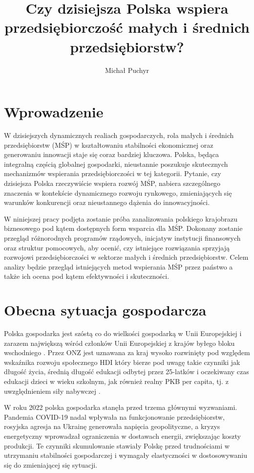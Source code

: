 \documentclass[11pt]{article}
\author{Michał Puchyr}
\date{}
\title{\textbf{Czy dzisiejsza Polska wspiera przedsiębiorczość małych i średnich przedsiębiorstw?}}
\begin{document}
\maketitle
\section*{Wprowadzenie}
W dzisiejszych dynamicznych realiach gospodarczych, rola małych i średnich przedsiębiorstw (MŚP) w kształtowaniu stabilności ekonomicznej
oraz generowaniu innowacji staje się coraz bardziej kluczowa. Polska, będąca integralną częścią globalnej gospodarki,
nieustannie poszukuje skutecznych mechanizmów wspierania przedsiębiorczości w tej kategorii. Pytanie, czy dzisiejsza Polska
rzeczywiście wspiera rozwój MŚP, nabiera szczególnego znaczenia w kontekście dynamicznego rozwoju rynkowego,
zmieniających się warunków konkurencji oraz nieustannego dążenia do innowacyjności.

W niniejszej pracy podjęta zostanie próba zanalizowania polskiego krajobrazu biznesowego pod kątem dostępnych form wsparcia dla MŚP.
Dokonany zostanie przegląd różnorodnych programów rządowych, inicjatyw instytucji finansowych oraz struktur pomocowych, aby ocenić,
czy istniejące rozwiązania sprzyjają rozwojowi przedsiębiorczości w sektorze małych i średnich przedsiębiorstw.
Celem analizy będzie przegląd istniejących metod wspierania MŚP przez państwo a także ich ocena pod kątem efektywności i skuteczności.

\section*{Obecna sytuacja gospodarcza}
Polska gospodarka jest szóstą co do wielkości gospodarką w Unii Europejskiej i zarazem największą 
wśród członków Unii Europejskiej z krajów byłego bloku wschodniego \cite{RankingGospodarek}.
Przez ONZ jest uznawana za kraj wysoko rozwinięty pod względem wskaźnika rozwoju społecznego HDI który
bierze pod uwagę takie czynniki jak długość życia, średnią długość edukacji odbytej
przez 25-latków i oczekiwany czas edukacji dzieci w wieku szkolnym, jak również 
realny PKB per capita, tj. z uwzględnieniem siły nabywczej \cite{RankingHDI}.

W roku 2022 polska gospodarka stanęła przed trzema głównymi wyzwaniami. Pandemia COVID-19 nadal wpływała na 
funkcjonowanie przedsiębiorstw, rosyjska agresja na Ukrainę generowała napięcia geopolityczne, 
a kryzys energetyczny wprowadzał ograniczenia w dostawach energii, zwiększając koszty produkcji. 
Te czynniki skumulowanie stawiały Polskę przed trudnościami w utrzymaniu stabilności gospodarczej 
i wymagały elastyczności w dostosowywaniu się do zmieniającej się sytuacji.
\end{document}
